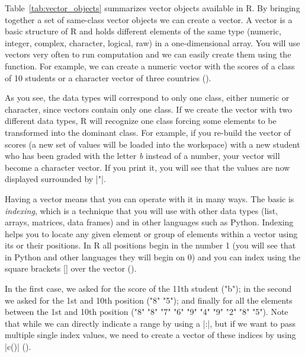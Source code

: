Table~\ref{tab:vector_objects} summarizes vector objects available in
R. By bringing together a set of same-class vector objects we can
create a vector. A vector is a basic structure of R and holds
different elements of the same type (numeric, integer, complex,
character, logical, raw) in a one-dimensional array. You will use
vectors very often to run computation and we can easily create them
using the  function. For example, we can create a numeric vector
with the scores of a class of 10 students or a character vector of
three countries ().


As you see, the data types will correspond to only one class, either
numeric or character, since vectors contain only one class. If we
create the vector with two different data types, R will recognize one
class forcing some elements to be transformed into the dominant
class. For example, if you re-build the vector of scores (a new set of
values will be loaded into the workspace) with a new student who has
been graded with the letter \emph{b} instead of a number, your vector
will become a character vector. If you print it, you will see that the
values are now displayed surrounded by |"|.


Having a vector means that you can operate with it in many ways. The
basic is \emph{indexing}, which is a technique that you will use with
other data types (list, arrays, matrices, data frames) and in other
languages such as Python.  Indexing helps you to locate any given
element or group of elements within a vector using its or their
positions. In R all positions begin in the number 1 (you will see that
in Python and other languages they will begin on 0) and you can index
using the square brackets [] over the vector ().


In the first case, we asked for the score of the 11th student ("b");
in the second we asked for the 1st and 10th position ("8" "5"); and
finally for all the elements between the 1st and 10th position ("8"
"8" "7" "6" "9" "4" "9" "2" "8" "5"). Note that while we can directly
indicate a range by using a |:|, but if we want to pass multiple
single index values, we need to create a vector of these indices by
using |c()| ().

